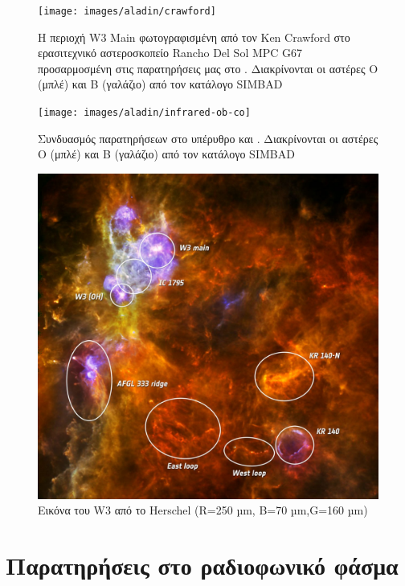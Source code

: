 \documentclass[a4paper,12pt]{memoir}
\begin{document}
\begin{figure}[h]
	\centering
	\texttt{[image: images/aladin/crawford]}
	\caption{Η περιοχή W3 Main φωτογραφισμένη από τον Ken Crawford στο ερασιτεχνικό αστεροσκοπείο Rancho Del Sol MPC G67 προσαρμοσμένη στις παρατηρήσεις μας στο . Διακρίνονται οι αστέρες O (μπλέ) και B (γαλάζιο) από τον κατάλογο SIMBAD}
	
	\centering
	\texttt{[image: images/aladin/infrared-ob-co]}
	\caption{Συνδυασμός παρατηρήσεων στο υπέρυθρο και . Διακρίνονται οι αστέρες O (μπλέ) και B (γαλάζιο) από τον κατάλογο SIMBAD}
\end{figure}


\begin{figure}[h]
	\centering
	\includegraphics[width=13cm]{images/w3_70_160_250_annotated.jpg}
	\caption{Εικόνα του W3 από το Herschel (R=250 µm, B=70 µm,G=160 µm)}
\end{figure}



\chapter{Παρατηρήσεις στο ραδιοφωνικό φάσμα}
\end{document}
